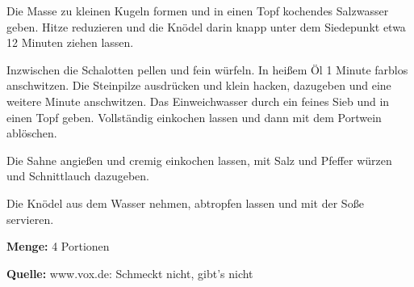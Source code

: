 {Die Masse zu kleinen Kugeln formen und in einen Topf kochendes Salzwasser geben. Hitze reduzieren und die Knödel darin knapp unter dem Siedepunkt etwa 12 Minuten ziehen lassen.

Inzwischen die Schalotten pellen und fein würfeln. In heißem Öl 1 Minute farblos anschwitzen. Die Steinpilze ausdrücken und klein hacken, dazugeben und eine weitere Minute anschwitzen. Das Einweichwasser durch ein feines Sieb und in einen Topf geben. Vollständig einkochen lassen und dann mit dem Portwein ablöschen.

Die Sahne angießen und cremig einkochen lassen, mit Salz und Pfeffer würzen und Schnittlauch dazugeben.

Die Knödel aus dem Wasser nehmen, abtropfen lassen und mit der Soße servieren.


{\bfseries Menge:} 4 Portionen

{\bfseries Quelle:} www.vox.de: Schmeckt nicht, gibt's nicht 

} 


